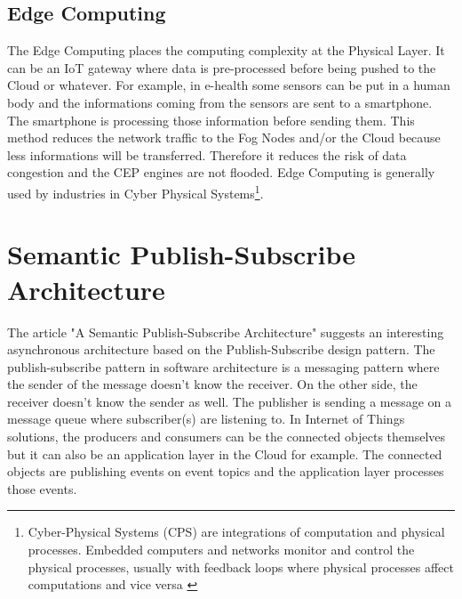 \documentclass[11pt]{article}
\begin{document}

\subsection{Edge Computing}

The Edge Computing places the computing complexity at the Physical Layer. It can be an IoT gateway where data is pre-processed before being pushed to the Cloud or whatever. For example, in e-health some sensors can be put in a human body and the informations coming from the sensors are sent to a smartphone. The smartphone is processing those information before sending them. This method reduces the network traffic to the Fog Nodes and/or the Cloud because less informations will be transferred. Therefore it reduces the risk of data congestion and the CEP engines are not flooded. Edge Computing is generally used by industries in Cyber Physical Systems\footnote{Cyber-Physical Systems (CPS) are integrations of computation and physical processes. Embedded computers and networks monitor and control the physical processes, usually with feedback loops where physical processes affect computations and vice versa \cite{5}}.


\section{Semantic Publish-Subscribe Architecture}

The article "A Semantic Publish-Subscribe Architecture" \cite{A Semantic Publish-Subscribe Architecture} suggests an interesting asynchronous architecture based on the Publish-Subscribe design pattern. The publish-subscribe pattern in software architecture is a messaging pattern where the sender of the message doesn't know the receiver. On the other side, the receiver doesn't know the sender as well. The publisher is sending a message on a message queue where subscriber(s) are listening to. In Internet of Things solutions, the producers and consumers can be the connected objects themselves but it can also be an application layer in the Cloud for example. The connected objects are publishing events on event topics and the application layer processes those events.
\end{document}
